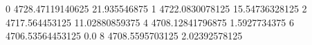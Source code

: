 0 4728.47119140625 21.935546875
1 4722.0830078125 15.54736328125
2 4717.564453125 11.02880859375
4 4708.12841796875 1.5927734375
6 4706.53564453125 0.0
8 4708.5595703125 2.02392578125
